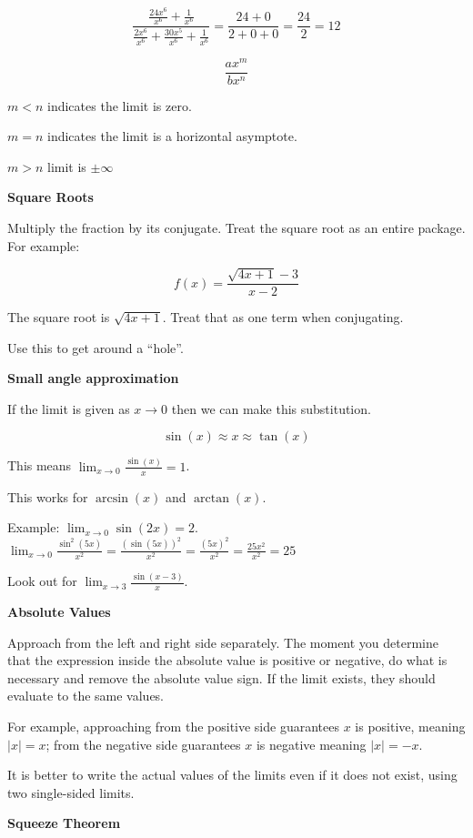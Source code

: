 \documentclass[12pt]{article}
\theoremstyle{plain}
\theoremstyle{remark}
\theoremstyle{definition}
\begin{document}
\[\frac{\frac{24x^{6}}{x^{6}} + \frac{1}{x^{6}}}{\frac{2x^{6}}{x^{6}} + \frac{30x^{5}}{x^{6}} + \frac{1}{x^{6}}} = \frac{24 + 0}{2 + 0 + 0} = \frac{24}{2} = 12\]


\[\frac{ax^{m}}{bx^{n}}\]

\(m < n\) indicates the limit is zero.

\(m = n\) indicates the limit is a horizontal asymptote.

\(m > n\) limit is \(\pm \infty\)

\textbf{Square Roots}

Multiply the fraction by its conjugate. Treat the square root as an
entire package. For example:

\[f(x) = \frac{\sqrt{4x + 1} - 3}{x - 2}\]

The square root is \(\sqrt{4x + 1}\). Treat that as one term when
conjugating.

Use this to get around a ``hole''.

\textbf{Small angle approximation}

If the limit is given as \(x \rightarrow 0\) then we can make this
substitution.

\[\sin(x) \approx x \approx \tan(x)\]

This means \(\lim_{x \rightarrow 0}{\frac{\sin(x)}{x} = 1}\).

This works for \(\arcsin(x)\) and \(\arctan(x)\).

Example: \(\lim_{x \rightarrow 0}{\sin(2x)} = 2\).
\(\lim_{x \rightarrow 0}{\frac{\sin^{2}(5x)}{x^{2}} = \frac{\left( \sin(5x) \right)^{2}}{x^{2}}} = \frac{(5x)^{2}}{x^{2}} = \frac{25x^{2}}{x^{2}} = 25\)

Look out for \(\lim_{x \rightarrow 3}\frac{\sin(x - 3)}{x}\).

\textbf{Absolute Values}

Approach from the left and right side separately. The moment you
determine that the expression inside the absolute value is positive or
negative, do what is necessary and remove the absolute value sign. If
the limit exists, they should evaluate to the same values.

For example, approaching from the positive side guarantees \(x\) is
positive, meaning \(|x| = x\); from the negative side guarantees \(x\)
is negative meaning \(|x| = - x\).

It is better to write the actual values of the limits even if it does
not exist, using two single-sided limits.

\textbf{Squeeze Theorem}
\end{document}
